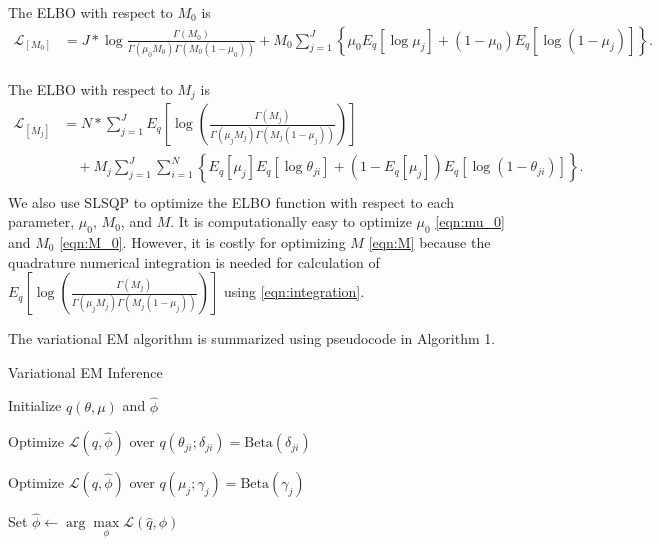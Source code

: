 \documentclass[11pt,reqno]{amsart}
\begin{document}
The ELBO with respect to $ M_0 $ is
\begin{equation}\label{eqn:M_0}
\begin{split}
\mathcal{L}_{[M_0]}
&=J* \log \frac{ \Gamma(M_0) } { \Gamma(\mu_0 M_0) \Gamma(M_0 (1-\mu_0))}
+ M_0 \sum_{j=1}^{J} \left\lbrace \mu_0E_q  \left[ \log \mu_j \right] + ( 1 - \mu_0) E_q  \left[ \log (1 - \mu_j)\right]\right\rbrace.  \\
\end{split}
\end{equation}


The ELBO with respect to $M_j$ is
\begin{equation}\label{eqn:M}
\begin{split}
\mathcal{L}_{{[M_j]}}
&= N* \sum_{j=1}^{J} E_q  \left[ \log \left( \frac{ \Gamma(M_j) } { \Gamma(\mu_j M_j) \Gamma(M_j (1-\mu_j)) }\right) \right] \\
&\quad + M_j \sum_{j=1}^{J} \sum_{i=1}^{N} \left\lbrace E_q \left[ \mu_j \right] E_q \left[ \log \theta_{ji} \right] + \left( 1 - E_q\left[ \mu_j \right]  \right) E_q\left[ \log \left( 1 - \theta_{ji}\right) \right] \right\rbrace. \\
\end{split}
\end{equation}
We also use SLSQP to optimize the ELBO function with respect to each parameter, $\mu_0$, $M_0$, and $M$.
It is computationally easy to optimize $\mu_0$ \eqref{eqn:mu_0} and $M_0$ \eqref{eqn:M_0}.
However, it is costly for optimizing $M$ \eqref{eqn:M} because the quadrature numerical integration is needed for calculation of $ E_q\left[ \log \left( \frac{ \Gamma(M_j) } { \Gamma(\mu_j M_j) \Gamma(M_j (1-\mu_j)) }\right)\right] $ using \eqref{eqn:integration}.

The variational EM algorithm is summarized using pseudocode in Algorithm 1.
\begin{algorithm}[ht]
  \caption{Variational EM Inference}

  \begin{algorithmic}[1]

  \State Initialize $q(\theta, \mu)$ and $\hat{\phi}$

  \Repeat

	\Repeat

			\State Optimize $\mathcal{L}(q, \hat{\phi})$ over $q(\theta_{ji}; \delta_{ji}) = \text{Beta} (\delta_{ji})$
			\EndFor
		\EndFor

            \State Optimize $\mathcal{L}(q, \hat{\phi})$ over $q(\mu_j; \gamma_j) = \text{Beta} (\gamma_j)$
        \EndFor


    \State Set $\hat{\phi} \leftarrow \arg \max\limits_{\phi}
            \mathcal{L}(\hat{q},\phi)$

  \end{algorithmic}

\end{algorithm}
%
\end{document}
